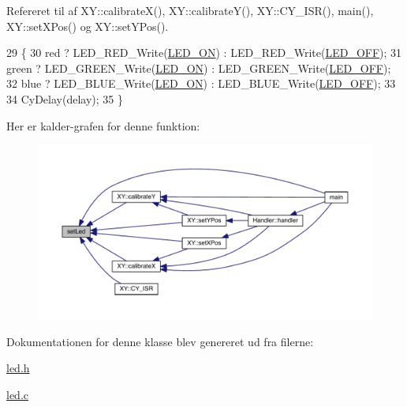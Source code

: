 Refereret til af X\+Y\+::calibrate\+X(), X\+Y\+::calibrate\+Y(), X\+Y\+::\+C\+Y\+\_\+\+I\+S\+R(), main(), X\+Y\+::set\+X\+Pos() og X\+Y\+::set\+Y\+Pos().


\begin{DoxyCode}
29 \{
30   red ? LED\_RED\_Write(\hyperlink{led_8h_af2e697ac60e05813d45ea2c9c9e79c25}{LED\_ON}) : LED\_RED\_Write(\hyperlink{led_8h_a80700bb63bd56ebabbb4728aa433fd29}{LED\_OFF});
31   green ? LED\_GREEN\_Write(\hyperlink{led_8h_af2e697ac60e05813d45ea2c9c9e79c25}{LED\_ON}) : LED\_GREEN\_Write(\hyperlink{led_8h_a80700bb63bd56ebabbb4728aa433fd29}{LED\_OFF});
32   blue ? LED\_BLUE\_Write(\hyperlink{led_8h_af2e697ac60e05813d45ea2c9c9e79c25}{LED\_ON}) : LED\_BLUE\_Write(\hyperlink{led_8h_a80700bb63bd56ebabbb4728aa433fd29}{LED\_OFF});
33   
34   CyDelay(delay);
35 \}
\end{DoxyCode}


Her er kalder-\/grafen for denne funktion\+:\nopagebreak
\begin{figure}[H]
\begin{center}
\leavevmode
\includegraphics[width=350pt]{d3/dbe/class_l_e_d_a1d8e725e3829da99c1d027ba0a2ce57a_icgraph}
\end{center}
\end{figure}




Dokumentationen for denne klasse blev genereret ud fra filerne\+:\begin{DoxyCompactItemize}
\item 
\hyperlink{led_8h}{led.\+h}\item 
\hyperlink{led_8c}{led.\+c}\end{DoxyCompactItemize}
